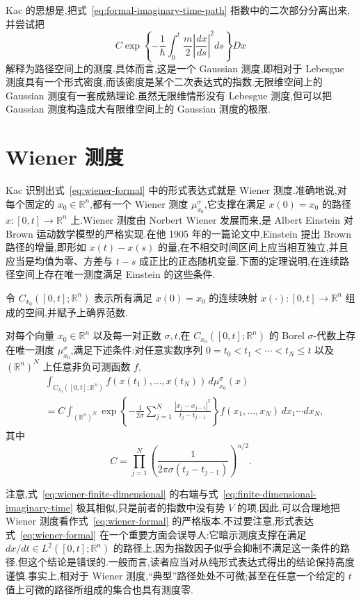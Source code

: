 Kac 的思想是,把式~\eqref{eq:formal-imaginary-time-path} 指数中的二次部分分离出来,并尝试把
\[
 C\exp\left\{-\frac1\hbar\int_0^t\frac m2
 \left|\frac{dx}{ds}\right|^2ds\right\}Dx\label{eq:wiener-formal}
\]
解释为路径空间上的测度.具体而言,这是一个 Gaussian 测度,即相对于 Lebesgue 测度具有一个形式密度,而该密度是某个二次表达式的指数.无限维空间上的 Gaussian 测度有一套成熟理论.虽然无限维情形没有 Lebesgue 测度,但可以把 Gaussian 测度构造成大有限维空间上的 Gaussian 测度的极限.

\section{Wiener 测度}
\label{sec:wiener-measure}

Kac 识别出式~\eqref{eq:wiener-formal} 中的形式表达式就是 Wiener 测度.准确地说,对每个固定的 $x_0\in\mathbb R^n$,都有一个 Wiener 测度 $\mu_{x_0}^{\sigma}$,它支撑在满足 $x(0)=x_0$ 的路径 $x:[0,t]\to\mathbb R^n$ 上.Wiener 测度由 Norbert Wiener 发展而来,是 Albert Einstein 对 Brown 运动数学模型的严格实现.在他 1905 年的一篇论文中,Einstein 提出 Brown 路径的增量,即形如 $x(t)-x(s)$ 的量,在不相交时间区间上应当相互独立,并且应当是均值为零、方差与 $t-s$ 成正比的正态随机变量.下面的定理说明,在连续路径空间上存在唯一测度满足 Einstein 的这些条件.

令 $C_{x_0}([0,t];\mathbb R^n)$ 表示所有满足 $x(0)=x_0$ 的连续映射 $x(\cdot):[0,t]\to\mathbb R^n$ 组成的空间,并赋予上确界范数.

\begin{theorem}\label{thm:wiener-measure}
对每个向量 $x_0\in\mathbb R^n$ 以及每一对正数 $\sigma,t$,在 $C_{x_0}([0,t];\mathbb R^n)$ 的 Borel $\sigma$-代数上存在唯一测度 $\mu_{x_0}^{\sigma}$,满足下述条件:对任意实数序列 $0=t_0<t_1<\cdots<t_N\le t$ 以及 $(\mathbb R^n)^N$ 上任意非负可测函数 $f$,
\[
\begin{aligned}
 &\int_{C_{x_0}([0,t];\mathbb R^n)}
 f(x(t_1),\ldots,x(t_N))\,d\mu_{x_0}^{\sigma}(x)\\
 &=C\int_{(\mathbb R^n)^N}
 \exp\left\{-\frac1{2\sigma}
 \sum_{j=1}^N\frac{|x_j-x_{j-1}|^2}{t_j-t_{j-1}}\right\}
 f(x_1,\ldots,x_N)\,dx_1\cdots dx_N,
\end{aligned}\label{eq:wiener-finite-dimensional}
\]
其中
\[
 C=\prod_{j=1}^N
 \left(\frac1{2\pi\sigma(t_j-t_{j-1})}\right)^{n/2}.
\]
\end{theorem}

注意,式~\eqref{eq:wiener-finite-dimensional} 的右端与式~\eqref{eq:finite-dimensional-imaginary-time} 极其相似,只是前者的指数中没有势 $V$ 的项.因此,可以合理地把 Wiener 测度看作式~\eqref{eq:wiener-formal} 的严格版本.不过要注意,形式表达式~\eqref{eq:wiener-formal} 在一个重要方面会误导人:它暗示测度支撑在满足 $dx/dt\in L^2([0,t];\mathbb R^n)$ 的路径上,因为指数因子似乎会抑制不满足这一条件的路径.但这个结论是错误的.一般而言,读者应当对从纯形式表达式得出的结论保持高度谨慎.事实上,相对于 Wiener 测度,“典型”路径处处不可微;甚至在任意一个给定的 $t$ 值上可微的路径所组成的集合也具有测度零.

